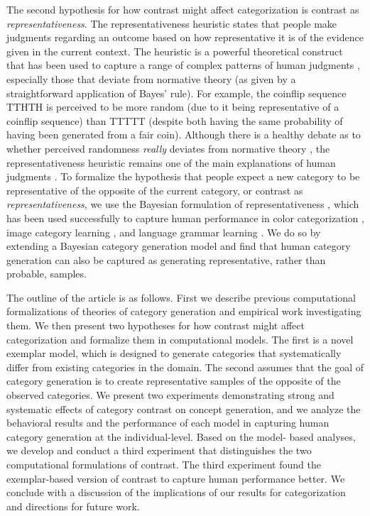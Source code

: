 \documentclass[pdflatex,sn-apa]{sn-jnl}%
\theoremstyle{thmstyleone}%
\theoremstyle{thmstyletwo}%
\theoremstyle{thmstylethree}%
\begin{document}
The second hypothesis for how contrast might affect categorization is contrast
as {\em representativeness}. The representativeness heuristic
\citep{kahneman1972subjective} states that people make judgments regarding an
outcome based on how representative it is of the evidence given in the current
context. The heuristic is a powerful theoretical construct that has been used to
capture a range of complex patterns of human judgments
\citep{kahneman73,tversky74,tversky83}, especially those that deviate from
normative theory (as given by a straightforward application of Bayes' rule). For
example, the coinflip sequence TTHTH is perceived to be more random (due to it
being representative of a coinflip sequence) than TTTTT (despite both having the
same probability of having been generated from a fair coin). Although there is a
healthy debate as to whether perceived randomness {\em really} deviates from
normative theory \citep{griffiths18,hahn09}, the representativeness heuristic
remains one of the main explanations of human judgments \citep{reimers18}. To
formalize the hypothesis that people expect a new category to be representative
of the opposite of the current category, or contrast as {\em
  representativeness}, we use the Bayesian formulation of representativeness
\citep{tenenbaum01}, which has been used successfully to capture human
performance in color categorization \citep{abbott16}, image category learning
\citep{abbott11}, and language grammar learning \citep{rafferty10}. We do so by
extending a Bayesian category generation model
\citep{jern2013probabilistic} and find that human category generation can
also be captured as generating representative, rather than probable, samples.

The outline of the article is as follows. First we describe previous
computational formalizations of theories of category generation and empirical
work investigating them. We then present two hypotheses for how contrast might
affect categorization and formalize them in computational models. The first is a
novel exemplar model, which is designed to generate categories that
systematically differ from existing categories in the domain. The second assumes
that the goal of category generation is to create representative samples of the
opposite of the observed categories. We present two experiments demonstrating
strong and systematic effects of category contrast on concept generation, and we
analyze the behavioral results and the performance of each model in
capturing human category generation at the individual-level. Based on the model-
based analyses, we develop and conduct a third experiment that distinguishes the two
computational formulations of contrast. The third experiment found the exemplar-based
version of contrast to capture human performance better. We conclude with a
discussion of the implications of our results for categorization and directions
for future work.
\end{document}

